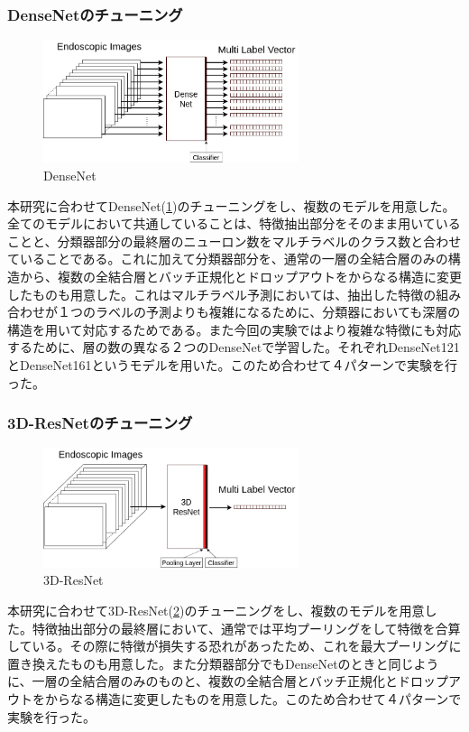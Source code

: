 \subsubsection{DenseNetのチューニング}

\begin{figure}[tb]
    \begin{center}
        \includegraphics[width=75mm]{./fig/2.png}
        \caption{DenseNet}
        \label{fig:densenet}
    \end{center}
\end{figure}

本研究に合わせてDenseNet(\ref{fig:densenet})のチューニングをし、複数のモデルを用意した。全てのモデルにおいて共通していることは、特徴抽出部分をそのまま用いていることと、分類器部分の最終層のニューロン数をマルチラベルのクラス数と合わせていることである。これに加えて分類器部分を、通常の一層の全結合層のみの構造から、複数の全結合層とバッチ正規化とドロップアウトをからなる構造に変更したものも用意した。これはマルチラベル予測においては、抽出した特徴の組み合わせが１つのラベルの予測よりも複雑になるために、分類器においても深層の構造を用いて対応するためである。また今回の実験ではより複雑な特徴にも対応するために、層の数の異なる２つのDenseNetで学習した。それぞれDenseNet121\cite{DenseNet}とDenseNet161\cite{DenseNet}というモデルを用いた。このため合わせて４パターンで実験を行った。
\subsubsection{3D-ResNetのチューニング}

\begin{figure}[tb]
    \begin{center}
        \includegraphics[width=75mm]{./fig/3.png}
        \caption{3D-ResNet}
        \label{fig:3d_resnet}
    \end{center}
\end{figure}

本研究に合わせて3D-ResNet(\ref{fig:3d_resnet})のチューニングをし、複数のモデルを用意した。特徴抽出部分の最終層において、通常では平均プーリングをして特徴を合算している。その際に特徴が損失する恐れがあったため、これを最大プーリングに置き換えたものも用意した。また分類器部分でもDenseNetのときと同じように、一層の全結合層のみのものと、複数の全結合層とバッチ正規化とドロップアウトをからなる構造に変更したものを用意した。このため合わせて４パターンで実験を行った。
